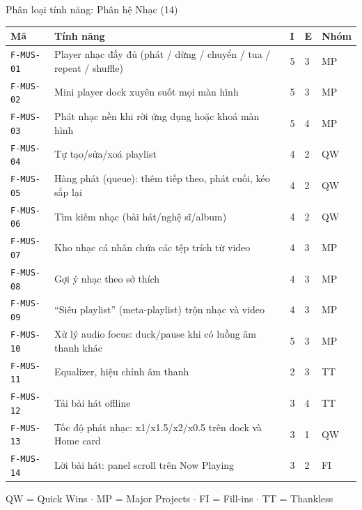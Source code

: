 \begin{frame}{Phân loại tính năng: Phân hệ Nhạc (14)}
\begin{center}\tiny
\begin{tabular}{@{}p{1.5cm}p{7.5cm}p{0.3cm}p{0.3cm}p{0.8cm}@{}}
\toprule
\textbf{Mã} & \textbf{Tính năng} & \textbf{I} & \textbf{E} & \textbf{Nhóm} \\
\midrule
\texttt{F-MUS-01} & Player nhạc đầy đủ (phát / dừng / chuyển / tua / repeat / shuffle) & 5 & 3 & MP \\
\texttt{F-MUS-02} & Mini player dock xuyên suốt mọi màn hình & 5 & 3 & MP \\
\texttt{F-MUS-03} & Phát nhạc nền khi rời ứng dụng hoặc khoá màn hình & 5 & 4 & MP \\
\texttt{F-MUS-04} & Tự tạo/sửa/xoá playlist & 4 & 2 & QW \\
\texttt{F-MUS-05} & Hàng phát (queue): thêm tiếp theo, phát cuối, kéo sắp lại & 4 & 2 & QW \\
\texttt{F-MUS-06} & Tìm kiếm nhạc (bài hát/nghệ sĩ/album) & 4 & 2 & QW \\
\texttt{F-MUS-07} & Kho nhạc cá nhân chứa các tệp trích từ video & 4 & 3 & MP \\
\texttt{F-MUS-08} & Gợi ý nhạc theo sở thích & 4 & 3 & MP \\
\texttt{F-MUS-09} & ``Siêu playlist'' (meta-playlist) trộn nhạc và video & 4 & 3 & MP \\
\texttt{F-MUS-10} & Xử lý audio focus: duck/pause khi có luồng âm thanh khác & 5 & 3 & MP \\
\texttt{F-MUS-11} & Equalizer, hiệu chỉnh âm thanh & 2 & 3 & TT \\
\texttt{F-MUS-12} & Tải bài hát offline & 3 & 4 & TT \\
\texttt{F-MUS-13} & Tốc độ phát nhạc: x1/x1.5/x2/x0.5 trên dock và Home card & 3 & 1 & QW \\
\texttt{F-MUS-14} & Lời bài hát: panel scroll trên Now Playing & 3 & 2 & FI \\
\bottomrule
\end{tabular}
\end{center}
\vfill
{\tiny\color{TextGray} QW = Quick Wins $\cdot$ MP = Major Projects $\cdot$ FI = Fill-ins $\cdot$ TT = Thankless}
\end{frame}

